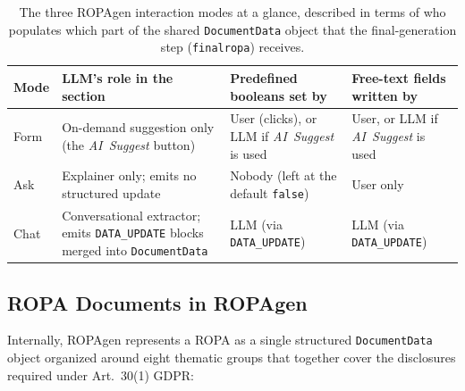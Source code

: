 \begin{table}[htbp]
    \centering
    \small
    \begin{tabularx}{\linewidth}{@{}l X X X@{}}
        \toprule
        Mode & LLM's role in the section & Predefined booleans set by & Free-text fields written by \\
        \midrule
        Form & On-demand suggestion only (the \emph{AI~Suggest} button) & User (clicks), or LLM if \emph{AI~Suggest} is used & User, or LLM if \emph{AI~Suggest} is used \\
        Ask  & Explainer only; emits no structured update & Nobody (left at the default \texttt{false}) & User only \\
        Chat & Conversational extractor; emits \texttt{DATA\_UPDATE} blocks merged into \texttt{DocumentData} & LLM (via \texttt{DATA\_UPDATE}) & LLM (via \texttt{DATA\_UPDATE}) \\
        \bottomrule
    \end{tabularx}
    \caption{The three ROPAgen interaction modes at a glance,
    described in terms of who populates which part of the shared
    \texttt{DocumentData} object that the final-generation step
    (\texttt{finalropa}) receives.}
    \label{tab:modes-overview}
\end{table}

\subsection{ROPA Documents in ROPAgen}

Internally, ROPAgen represents a ROPA as a single structured \texttt{DocumentData} object organized around eight thematic groups that together cover the disclosures required under Art.~30(1) GDPR:

